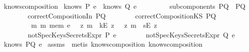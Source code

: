 \begin{isabellebody}
\isanewline
\endisadelimproof
\isanewline
{}\isamarkupfalse \ knows{\isacharunderscore}composition{}{\isacharcolon}\isanewline
{}\ {\isachardoublequoteopen}knows\ P\ e\ {\isasymor}\ knows\ Q\ e{\isachardoublequoteclose}\ \isanewline
\ \ \ \ \ \ \ \ {\isachardoublequoteopen}subcomponents\ PQ\ {\isacharequal}\ {\isacharbraceleft}P{\isacharcomma}Q{\isacharbraceright}{\isachardoublequoteclose}\isanewline
\ \ \ \ \ \ \ \ {\isachardoublequoteopen}correctCompositionIn\ PQ{\isachardoublequoteclose}\isanewline
\ \ \ \ \ \ \ \ {\isachardoublequoteopen}correctCompositionKS\ PQ{\isachardoublequoteclose}\isanewline
\ \ \ \ \ \ \ \ {\isachardoublequoteopen}{\isasymforall}\ m{\isachardot}\ m\ mem\ e\ {\isasymlongrightarrow}\ {\isacharparenleft}{\isacharparenleft}{\isasymexists}\ z{\isachardot}\ m\ {\isacharequal}\ kE\ z{\isacharparenright}\ {\isasymor}\ {\isacharparenleft}{\isasymexists}\ z{\isachardot}\ m\ {\isacharequal}\ sE\ z{\isacharparenright}{\isacharparenright}{\isachardoublequoteclose}\isanewline
\ \ \ \ \ \ \ \ {\isachardoublequoteopen}notSpecKeysSecretsExpr\ P\ e{\isachardoublequoteclose}\isanewline
\ \ \ \ \ \ \ \ {\isachardoublequoteopen}notSpecKeysSecretsExpr\ Q\ e{\isachardoublequoteclose}\ \isanewline
{}\ {\isachardoublequoteopen}knows\ PQ\ e{\isachardoublequoteclose}\isanewline
\isadelimproof
\endisadelimproof
\isatagproof
{}\isamarkupfalse \ assms\ \isamarkupfalse \ {\isacharparenleft}metis\ knows{\isacharunderscore}composition{}\ knows{\isacharunderscore}composition{}{\isacharparenright}\endisatagproof
{\isafoldproof}\isadelimproof
\isanewline
\endisadelimproof
\isadelimtheory
\isanewline
\endisadelimtheory
\isatagtheory
{}\isamarkupfalse \endisatagtheory
{\isafoldtheory}\isadelimtheory
\endisadelimtheory
\ \end{isabellebody}